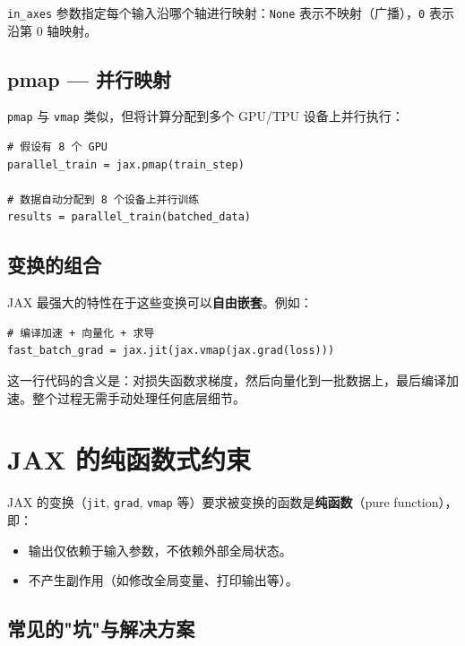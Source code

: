 \documentclass[12pt,a4paper]{article}
\begin{document}
\texttt{in\_axes} 参数指定每个输入沿哪个轴进行映射：\texttt{None} 表示不映射（广播），\texttt{0} 表示沿第 0 轴映射。

\subsection{pmap --- 并行映射}

\texttt{pmap} 与 \texttt{vmap} 类似，但将计算分配到多个 GPU/TPU 设备上并行执行：

\begin{lstlisting}
# 假设有 8 个 GPU
parallel_train = jax.pmap(train_step)

# 数据自动分配到 8 个设备上并行训练
results = parallel_train(batched_data)
\end{lstlisting}

\subsection{变换的组合}

JAX 最强大的特性在于这些变换可以\textbf{自由嵌套}。例如：

\begin{lstlisting}
# 编译加速 + 向量化 + 求导
fast_batch_grad = jax.jit(jax.vmap(jax.grad(loss)))
\end{lstlisting}

这一行代码的含义是：对损失函数求梯度，然后向量化到一批数据上，最后编译加速。整个过程无需手动处理任何底层细节。

\section{JAX 的纯函数式约束}

JAX 的变换（\texttt{jit}, \texttt{grad}, \texttt{vmap} 等）要求被变换的函数是\textbf{纯函数}（pure function），即：

\begin{itemize}
    \item 输出仅依赖于输入参数，不依赖外部全局状态。
    \item 不产生副作用（如修改全局变量、打印输出等）。
\end{itemize}

\subsection{常见的"坑"与解决方案}
\end{document}
